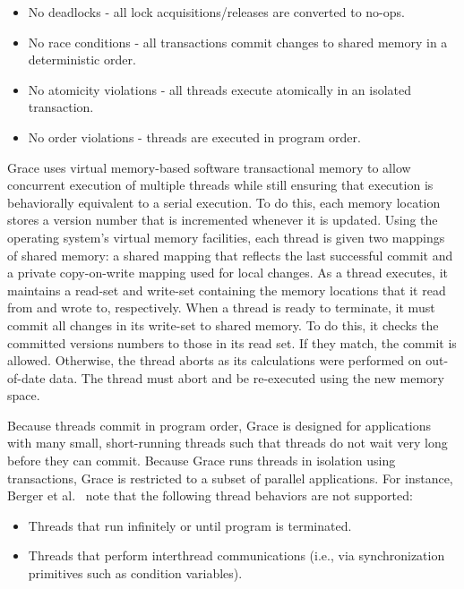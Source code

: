 \begin{itemize}
\item No deadlocks - all lock acquisitions/releases are converted to
  no-ops.

\item No race conditions - all transactions commit changes to shared
  memory in a deterministic order.

\item No atomicity violations - all threads execute atomically in an
  isolated transaction.

\item No order violations - threads are executed in program order.
\end{itemize}

Grace uses virtual memory-based software transactional memory to allow
concurrent execution of multiple threads while still ensuring that
execution is behaviorally equivalent to a serial execution.  To do
this, each memory location stores a version number that is incremented
whenever it is updated.  Using the operating system's virtual memory
facilities, each thread is given two mappings of shared memory: a
shared mapping that reflects the last successful commit and a private
copy-on-write mapping used for local changes.  As a thread executes,
it maintains a read-set and write-set containing the memory locations
that it read from and wrote to, respectively.  When a thread is ready
to terminate, it must commit all changes in its write-set to shared
memory.  To do this, it checks the committed versions numbers to those
in its read set.  If they match, the commit is allowed.  Otherwise,
the thread aborts as its calculations were performed on out-of-date
data.  The thread must abort and be re-executed using the new memory
space.

Because threads commit in program order, Grace is designed for
applications with many small, short-running threads such that threads
do not wait very long before they can commit. Because Grace runs
threads in isolation using transactions, Grace is restricted to a
subset of parallel applications.  For instance, Berger et
al.~\cite{grace} note that the following thread behaviors are not
supported:

\begin{itemize}
\item Threads that run infinitely or until program is terminated.

\item Threads that perform interthread communications (i.e., via
  synchronization primitives such as condition variables).
\end{itemize}

